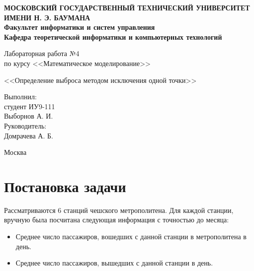 \documentclass[12pt,a4paper,oneside]{extarticle}
\begin{document}
\pgfplotsset{compat=1.8}

\thispagestyle{empty}
\newpage
{
\centering


\textbf{
МОСКОВСКИЙ ГОСУДАРСТВЕННЫЙ ТЕХНИЧЕСКИЙ УНИВЕРСИТЕТ ИМЕНИ Н. Э. БАУМАНА \\
Факультет информатики и систем управления \\
Кафедра теоретической информатики и компьютерных технологий}
\bigskip
\bigskip
\bigskip
\bigskip
\bigskip
\bigskip
\bigskip

\vfill


Лабораторная работа №4 \\
по курсу <<Математическое моделирование>>

\bigskip

{\large <<Определение выброса методом исключения одной точки>>}
\bigskip

\vfill



\hfill\parbox{4cm} {
Выполнил:\\
студент ИУ9-111 \hfill \\
Выборнов А. И.\hfill \medskip\\
Руководитель:\\
Домрачева А. Б.\hfill
}


\vspace{\fill}

Москва \number\year
\clearpage
}



\clearpage


\section{Постановка задачи}
    Рассматриваются 6 станций чешского метрополитена. Для каждой станции, вручную была посчитана следующая информация с точностью до месяца:
    \begin{itemize}
        \item Среднее число пассажиров, вошедших с данной станции в метрополитена в день.
        \item Среднее число пассажиров, вышедших с данной станции в день.
    \end{itemize}
\end{document}
